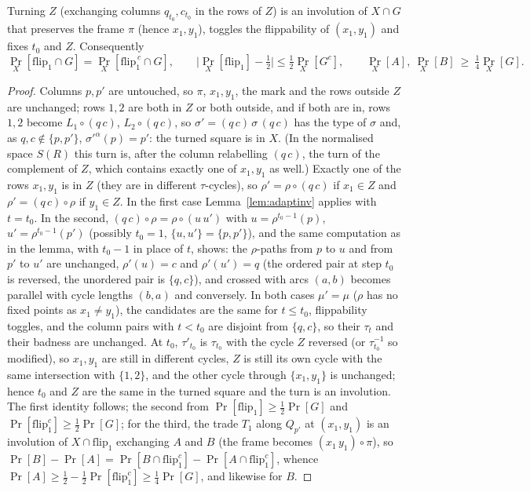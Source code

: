 \begin{proposition}\label{prop:firstpair}
Turning $Z$ (exchanging columns $q_{t_0},c_{t_0}$ in the rows of $Z$)
is an involution of $X\cap G$ that preserves the frame $\pi$ (hence
$x_1,y_1$), toggles the flippability of $(x_1,y_1)$ and fixes $t_0$ and
$Z$.  Consequently
\[
\Pr_X[\mathrm{flip}_1\cap G]=\Pr_X[\mathrm{flip}_1^{\,c}\cap G],\qquad
\bigl|\Pr_X[\mathrm{flip}_1]-\tfrac12\bigr|\le\tfrac12\Pr_X[G^c],\qquad
\Pr_X[A],\ \Pr_X[B]\ \ge\ \tfrac14\Pr_X[G].
\]
\end{proposition}

\begin{proof}
Columns $p,p'$ are untouched, so $\pi$, $x_1,y_1$, the mark and the
rows outside $Z$ are unchanged; rows $1,2$ are both in $Z$ or both
outside, and if both are in, rows $1,2$ become $L_1\circ(q\,c)$,
$L_2\circ(q\,c)$, so $\sigma'=(q\,c)\,\sigma\,(q\,c)$ has the type of
$\sigma$ and, as $q,c\notin\{p,p'\}$, $\sigma'^{\alpha}(p)=p'$: the
turned square is in $X$.  (In the normalised space $S(R)$ this turn
is, after the column relabelling $(q\,c)$, the turn of the complement
of $Z$, which contains exactly one of $x_1,y_1$ as well.)  Exactly one
of the rows $x_1,y_1$ is in $Z$ (they are in different $\tau$-cycles),
so $\rho'=\rho\circ(q\,c)$ if $x_1\in Z$ and $\rho'=(q\,c)\circ\rho$ if
$y_1\in Z$.  In the first case Lemma~\ref{lem:adaptinv} applies with
$t=t_0$.  In the second, $(q\,c)\circ\rho=\rho\circ(u\,u')$ with
$u=\rho^{t_0-1}(p)$, $u'=\rho^{t_0-1}(p')$ (possibly $t_0=1$,
$\{u,u'\}=\{p,p'\}$), and the same computation as in the lemma, with
$t_0-1$ in place of $t$, shows: the $\rho$-paths from $p$ to $u$ and
from $p'$ to $u'$ are unchanged, $\rho'(u)=c$ and $\rho'(u')=q$ (the
ordered pair at step $t_0$ is reversed, the unordered pair is
$\{q,c\}$), and crossed with arcs $(a,b)$ becomes parallel with cycle
lengths $(b,a)$ and conversely.  In both cases $\mu'=\mu$ ($\rho$ has no
fixed points as $x_1\neq y_1$), the candidates are the same for
$t\le t_0$, flippability toggles, and the column pairs with $t<t_0$ are
disjoint from $\{q,c\}$, so their $\tau_t$ and their badness are
unchanged.  At $t_0$, $\tau'_{t_0}$ is $\tau_{t_0}$ with the
cycle $Z$ reversed (or $\tau_{t_0}^{-1}$ so modified), so $x_1,y_1$ are
still in different cycles, $Z$ is still its own cycle with the same
intersection with $\{1,2\}$, and the other cycle through
$\{x_1,y_1\}$ is unchanged; hence $t_0$ and $Z$ are the same in the
turned square and the turn is an involution.  The first identity
follows; the second from $\Pr[\mathrm{flip}_1]\ge\tfrac12\Pr[G]$ and
$\Pr[\mathrm{flip}_1^c]\ge\tfrac12\Pr[G]$; for the third, the trade
$T_1$ along $Q_{p'}$ at $(x_1,y_1)$ is an involution of
$X\cap\mathrm{flip}_1$ exchanging $A$ and $B$ (the frame becomes
$(x_1\,y_1)\circ\pi$), so
$\Pr[B]-\Pr[A]=\Pr[B\cap\mathrm{flip}_1^c]-\Pr[A\cap\mathrm{flip}_1^c]$,
whence $\Pr[A]\ge\tfrac12-\tfrac12\Pr[\mathrm{flip}_1^c]\ge\tfrac14\Pr[G]$,
and likewise for $B$.
\end{proof}

